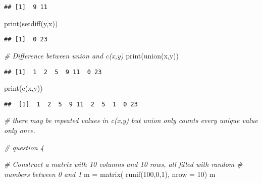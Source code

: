 \documentclass[
]{article}
\newenvironment{Shaded}{\begin{snugshade}}{\end{snugshade}}
\newcommand{\AttributeTok}[1]{\textcolor[rgb]{0.77,0.63,0.00}{#1}}
\newcommand{\CommentTok}[1]{\textcolor[rgb]{0.56,0.35,0.01}{\textit{#1}}}
\newcommand{\DecValTok}[1]{\textcolor[rgb]{0.00,0.00,0.81}{#1}}
\newcommand{\FunctionTok}[1]{\textcolor[rgb]{0.00,0.00,0.00}{#1}}
\newcommand{\NormalTok}[1]{#1}
\newcommand{\OtherTok}[1]{\textcolor[rgb]{0.56,0.35,0.01}{#1}}
\begin{document}
\begin{verbatim}
## [1]  9 11
\end{verbatim}

\begin{Shaded}
\begin{Highlighting}[]
\FunctionTok{print}\NormalTok{(}\FunctionTok{setdiff}\NormalTok{(y,x))}
\end{Highlighting}
\end{Shaded}

\begin{verbatim}
## [1]  0 23
\end{verbatim}

\begin{Shaded}
\begin{Highlighting}[]
\CommentTok{\# Difference between union and c(x,y)}
\FunctionTok{print}\NormalTok{(}\FunctionTok{union}\NormalTok{(x,y))}
\end{Highlighting}
\end{Shaded}

\begin{verbatim}
## [1]  1  2  5  9 11  0 23
\end{verbatim}

\begin{Shaded}
\begin{Highlighting}[]
\FunctionTok{print}\NormalTok{(}\FunctionTok{c}\NormalTok{(x,y))}
\end{Highlighting}
\end{Shaded}

\begin{verbatim}
##  [1]  1  2  5  9 11  2  5  1  0 23
\end{verbatim}

\begin{Shaded}
\begin{Highlighting}[]
\CommentTok{\# there may be repeated values in c(x,y) but union only counts every unique value only once.}

\CommentTok{\# question 4}

\CommentTok{\# Construct a matrix with 10 columns and 10 rows, all filled with random}
\CommentTok{\# numbers between 0 and 1}
\NormalTok{m }\OtherTok{=} \FunctionTok{matrix}\NormalTok{( }\FunctionTok{runif}\NormalTok{(}\DecValTok{100}\NormalTok{,}\DecValTok{0}\NormalTok{,}\DecValTok{1}\NormalTok{), }\AttributeTok{nrow =} \DecValTok{10}\NormalTok{)}
\NormalTok{m}
\end{Highlighting}
\end{Shaded}
\end{document}
